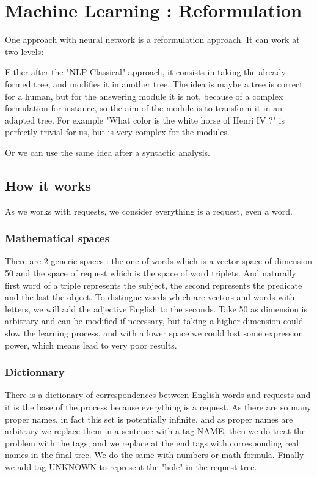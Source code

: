 \section{Machine Learning : Reformulation}

One approach with neural network is a reformulation approach. It can work at two levels: 

Either after the "NLP Classical" approach, it consists in taking the already formed tree, and modifies it in another tree. The idea is maybe a tree is correct for a human, but for the answering module it is not, because of a complex formulation for instance, so the aim of the module is to transform it in an adapted tree. For example "What color is the white horse of Henri IV ?" is perfectly trivial for us, but is very complex for the modules.

Or we can use the same idea after a syntactic analysis. 

\subsection{How it works}

As we works with requests, we consider everything is a request, even a word.

\subsubsection{Mathematical spaces}

There are 2 generic spaces : the one of words which is a vector space of dimension 50 and the space of request which is the space of word triplets. And naturally first word of a triple represents the subject, the second represents the predicate and the last the object.
To distingue words which are vectors and words with letters, we will add the adjective English to the seconds.
Take 50 as dimension is arbitrary and can be modified if necessary, but taking a higher dimension could slow the learning process, and with a lower space we could lost some expression power, which means lead to very poor results.

\subsubsection{Dictionnary}

There is a dictionary of correspondences between English words and requests and it is the base of the process because everything is a request. As there are so many proper names, in fact this set is potentially infinite, and as proper names are arbitrary we replace them in a sentence with a tag NAME, then we do treat the problem with the tags, and we replace at the end tags with corresponding real names in the final tree. We do the same with numbers or math formula. Finally we add tag UNKNOWN to represent the "hole" in the request tree.

